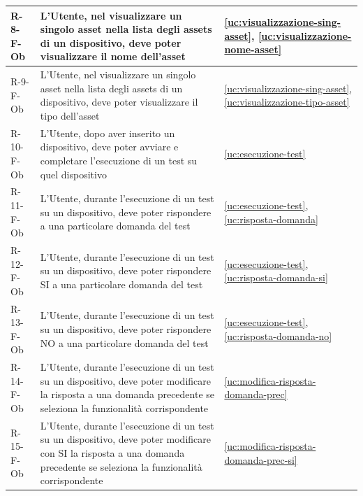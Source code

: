 ﻿\documentclass[a4paper,12pt]{article}
\begin{document}
{{\begin{longtable}{|l|p{}|p{}|}
            R-8-F-Ob        & L'Utente, nel visualizzare un singolo asset nella lista degli assets di un dispositivo, deve poter visualizzare il nome dell'asset                                                          & \ref{uc:visualizzazione-sing-asset}, \ref{uc:visualizzazione-nome-asset}               \\ \hline
            R-9-F-Ob        & L'Utente, nel visualizzare un singolo asset nella lista degli assets di un dispositivo, deve poter visualizzare il tipo dell'asset                                                          & \ref{uc:visualizzazione-sing-asset}, \ref{uc:visualizzazione-tipo-asset}               \\ \hline
            R-10-F-Ob       & L'Utente, dopo aver inserito un dispositivo, deve poter avviare e completare l'esecuzione di un test su quel dispositivo                                                                    & \ref{uc:esecuzione-test}                                                 \\ \hline
            R-11-F-Ob       & L'Utente, durante l'esecuzione di un test su un dispositivo, deve poter rispondere a una particolare domanda del test                                                                       & \ref{uc:esecuzione-test}, \ref{uc:risposta-domanda}                     \\ \hline
            R-12-F-Ob       & L'Utente, durante l'esecuzione di un test su un dispositivo, deve poter rispondere SI a una particolare domanda del test                                                                       & \ref{uc:esecuzione-test}, \ref{uc:risposta-domanda-si}                     \\ \hline
            R-13-F-Ob       & L'Utente, durante l'esecuzione di un test su un dispositivo, deve poter rispondere NO a una particolare domanda del test                                                                       & \ref{uc:esecuzione-test}, \ref{uc:risposta-domanda-no}                     \\ \hline
            R-14-F-Ob       & L'Utente, durante l'esecuzione di un test su un dispositivo, deve poter modificare la risposta a una domanda precedente se seleziona la funzionalità corrispondente                         & \ref{uc:modifica-risposta-domanda-prec}                                                 \\ \hline
            R-15-F-Ob       & L'Utente, durante l'esecuzione di un test su un dispositivo, deve poter modificare con SI la risposta a una domanda precedente se seleziona la funzionalità corrispondente                         & \ref{uc:modifica-risposta-domanda-prec-si}                                                 \\ \hline

\end{longtable}}}
\end{document}
